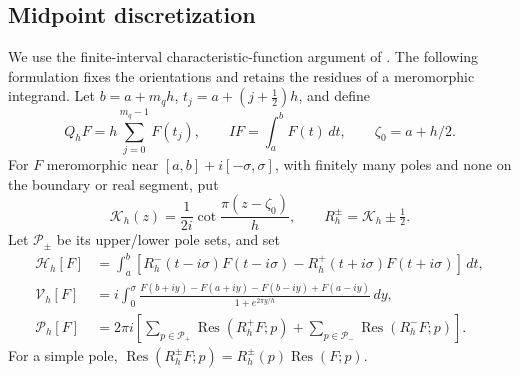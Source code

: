 \subsection{Midpoint discretization}
\label{sec:quadrature}
We use the finite-interval characteristic-function argument of
\cite[Secs.~4--5]{JavedTrefethen2014}. The following formulation fixes the
orientations and retains the residues of a meromorphic integrand.
Let $b=a+m_qh$, $t_j=a+(j+\tfrac12)h$, and define
\[
 Q_hF=h\sum_{j=0}^{m_q-1}F(t_j),\qquad IF=\int_a^bF(t)\,dt,
 \qquad \zeta_0=a+h/2.
\]
For $F$ meromorphic near $[a,b]+i[-\sigma,\sigma]$, with finitely many poles
and none on the boundary or real segment, put
\begin{equation}
 \mathcal K_h(z)=\frac1{2i}\cot\frac{\pi(z-\zeta_0)}h,
 \qquad R_h^\pm=\mathcal K_h\pm\tfrac12.
 \label{eq:characteristic}
\end{equation}
Let $\mathcal P_\pm$ be its upper/lower pole sets, and set
\begin{align}
 \mathcal H_h[F]&=\int_a^b
 [R_h^-(t-i\sigma)F(t-i\sigma)-R_h^+(t+i\sigma)F(t+i\sigma)]\,dt,
 \label{eq:Hquad}\\
 \mathcal V_h[F]&=i\int_0^\sigma
 \frac{F(b+iy)-F(a+iy)-F(b-iy)+F(a-iy)}{1+e^{2\pi y/h}}\,dy,
 \label{eq:Vquad}\\
 \mathcal P_h[F]&=2\pi i\left[
 \sum_{p\in\mathcal P_+}\operatorname{Res}(R_h^+F;p)
 +\sum_{p\in\mathcal P_-}\operatorname{Res}(R_h^-F;p)\right].
 \label{eq:Pquad}
\end{align}
For a simple pole, $\operatorname{Res}(R_h^\pm F;p)
=R_h^\pm(p)\operatorname{Res}(F;p)$.

